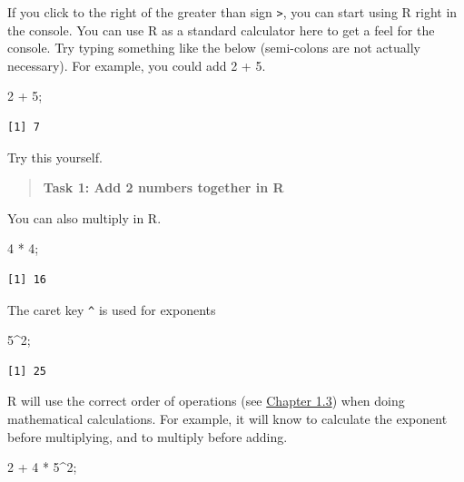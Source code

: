 \documentclass[
]{scrbook}
\newenvironment{Shaded}{\begin{snugshade}}{\end{snugshade}}
\newcommand{\DecValTok}[1]{\textcolor[rgb]{0.00,0.00,0.81}{#1}}
\newcommand{\NormalTok}[1]{#1}
\newcommand{\SpecialCharTok}[1]{\textcolor[rgb]{0.00,0.00,0.00}{#1}}
\begin{document}
If you click to the right of the greater than sign \texttt{\textgreater{}}, you can start using R right in the console.
You can use R as a standard calculator here to get a feel for the console.
Try typing something like the below (semi-colons are not actually necessary).
For example, you could add 2 + 5.

\begin{Shaded}
\begin{Highlighting}[]
\DecValTok{2} \SpecialCharTok{+} \DecValTok{5}\NormalTok{;  }
\end{Highlighting}
\end{Shaded}

\begin{verbatim}
[1] 7
\end{verbatim}

Try this yourself.

\begin{quote}
\textbf{Task 1: Add 2 numbers together in R}
\end{quote}

You can also multiply in R.

\begin{Shaded}
\begin{Highlighting}[]
\DecValTok{4} \SpecialCharTok{*} \DecValTok{4}\NormalTok{;  }
\end{Highlighting}
\end{Shaded}

\begin{verbatim}
[1] 16
\end{verbatim}

The caret key \texttt{\^{}} is used for exponents

\begin{Shaded}
\begin{Highlighting}[]
\DecValTok{5}\SpecialCharTok{\^{}}\DecValTok{2}\NormalTok{;  }
\end{Highlighting}
\end{Shaded}

\begin{verbatim}
[1] 25
\end{verbatim}

R will use the correct order of operations (see \protect\hyperlink{order-of-operations}{Chapter 1.3}) when doing mathematical calculations.
For example, it will know to calculate the exponent before multiplying, and to multiply before adding.

\begin{Shaded}
\begin{Highlighting}[]
\DecValTok{2} \SpecialCharTok{+} \DecValTok{4} \SpecialCharTok{*} \DecValTok{5}\SpecialCharTok{\^{}}\DecValTok{2}\NormalTok{;  }
\end{Highlighting}
\end{Shaded}
\end{document}
